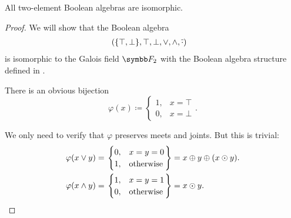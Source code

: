 \begin{proposition}\label{thm:binary_boolean_algebras_are_isomorphic}
  All two-element Boolean algebras are isomorphic.
\end{proposition}
\begin{proof}
  We will show that the Boolean algebra
  \begin{align*}
    &\left( \{ \top, \bot \}, \top, \bot, \vee, \wedge, \overline{\cdot} \right)
  \end{align*}
  is isomorphic to the Galois field \( \BF_2 \) with the Boolean algebra structure defined in .

  There is an obvious bijection
  \begin{equation*}
    \varphi(x) \coloneqq \begin{cases}
      1, &x = \top \\
      0, &x = \bot
    \end{cases}.
  \end{equation*}

  We only need to verify that \( \varphi \) preserves meets and joints. But this is trivial:
  \begin{align*}
    \varphi(x \vee y)
    &=
    \begin{rcases}
      \begin{cases}
        0, &x = y = 0 \\
        1, &\text{otherwise}
      \end{cases}
    \end{rcases}
    =
    x \oplus y \oplus (x \odot y).
    \\
    \varphi(x \wedge y)
    &=
    \begin{rcases}
      \begin{cases}
        1, &x = y = 1 \\
        0, &\text{otherwise}
      \end{cases}
    \end{rcases}
    =
    x \odot y.
  \end{align*}
\end{proof}
